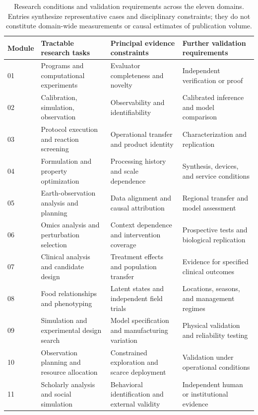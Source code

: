 \begin{table}[H]
\caption{Research conditions and validation requirements across the eleven domains. Entries synthesize representative cases and disciplinary constraints; they do not constitute domain-wide measurements or causal estimates of publication volume.}
\label{tab:coverageimbalance}
\scriptsize
\begin{tabularx}{\textwidth}{@{}p{}>{\raggedright\arraybackslash}X>{\raggedright\arraybackslash}X>{\raggedright\arraybackslash}X@{}}
\toprule
Module & Tractable research tasks & Principal evidence constraints & Further validation requirements \\
\midrule
01 & Programs and computational experiments & Evaluator completeness and novelty & Independent verification or proof \\
02 & Calibration, simulation, observation & Observability and identifiability & Calibrated inference and model comparison \\
03 & Protocol execution and reaction screening & Operational transfer and product identity & Characterization and replication \\
04 & Formulation and property optimization & Processing history and scale dependence & Synthesis, devices, and service conditions \\
05 & Earth-observation analysis and planning & Data alignment and causal attribution & Regional transfer and model assessment \\
06 & Omics analysis and perturbation selection & Context dependence and intervention coverage & Prospective tests and biological replication \\
07 & Clinical analysis and candidate design & Treatment effects and population transfer & Evidence for specified clinical outcomes \\
08 & Food relationships and phenotyping & Latent states and independent field trials & Locations, seasons, and management regimes \\
09 & Simulation and experimental design search & Model specification and manufacturing variation & Physical validation and reliability testing \\
10 & Observation planning and resource allocation & Constrained exploration and scarce deployment & Validation under operational conditions \\
11 & Scholarly analysis and social simulation & Behavioral identification and external validity & Independent human or institutional evidence \\
\bottomrule
\end{tabularx}
\end{table}

